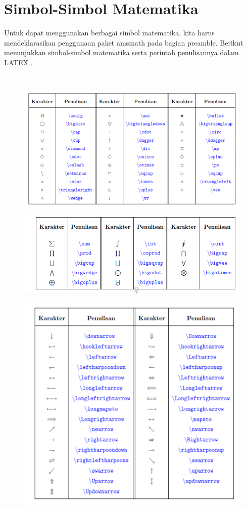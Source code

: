 \section{Simbol-Simbol Matematika}
\begin{raggedleft}Untuk dapat menggunakan berbagai simbol matematika, kita harus mendeklarasikan penggunaan paket amsmath pada bagian preamble. Berikut menunjukkan simbol-simbol matematika serta perintah penulisannya dalam LATEX .\end{raggedleft}\\[0.5 cm]
\begin{figure}[h!]
\centering
\includegraphics[width=10 cm]{img/14.png}
\end{figure}

\begin{figure}[h!]
\centering
\includegraphics[width=10 cm]{img/15.png}
\end{figure}

\begin{figure}[h!]
\centering
\includegraphics[width=10 cm]{img/16.png}
\end{figure}

